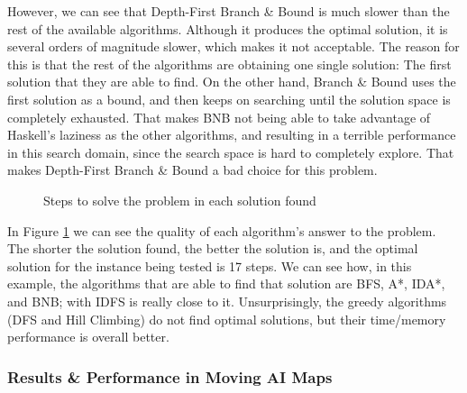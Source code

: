 However, we can see that Depth-First Branch \& Bound is much slower than the
rest of the available algorithms. Although it produces the optimal solution, it
is several orders of magnitude slower, which makes it not acceptable. The
reason for this is that the rest of the algorithms are obtaining one single
solution: The first solution that they are able to find. On the other hand,
Branch \& Bound uses the first solution as a bound, and then keeps on searching
until the solution space is completely exhausted. That makes BNB not being able
to take advantage of Haskell's laziness as the other algorithms, and resulting
in a terrible performance in this search domain, since the search space is hard
to completely explore. That makes Depth-First Branch \& Bound a bad choice for
this problem.\\

\begin{figure}[!htbp]
  \centering
  \caption{Steps to solve the problem in each solution found}
  \label{8p:steps}
\end{figure}

In Figure \ref{8p:steps} we can see the quality of each algorithm's answer to
the problem. The shorter the solution found, the better the solution is, and
the optimal solution for the instance being tested is 17 steps. We can see how,
in this example, the algorithms that are able to find that solution are BFS,
A*, IDA*, and BNB; with IDFS is really close to it. Unsurprisingly, the greedy
algorithms (DFS and Hill Climbing) do not find optimal solutions, but their
time/memory performance is overall better.\\

\subsubsection{Results \& Performance in Moving AI Maps}

